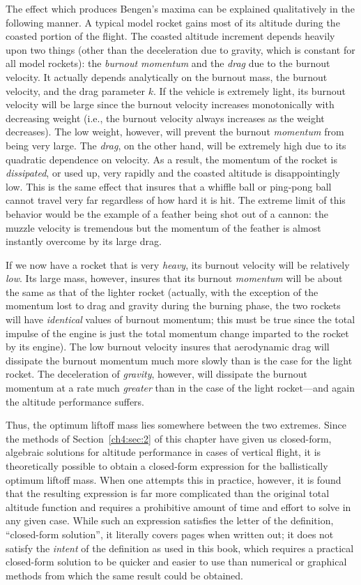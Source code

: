 The effect which produces Bengen's maxima can be explained qualitatively in the following manner.
A typical model rocket gains most of its altitude during the coasted portion of the flight. The
coasted altitude increment depends heavily upon two things (other than the deceleration due to
gravity, which is constant for all model rockets): the \emph{burnout momentum} and the \emph{drag}
due to the burnout velocity. It actually depends analytically on the burnout mass, the burnout
velocity, and the drag parameter $k$. If the vehicle is extremely light, its burnout velocity will
be large since the burnout velocity increases monotonically with decreasing weight (i.e., the
burnout velocity always increases as the weight decreases). The low weight, however, will prevent
the burnout \emph{momentum} from being very large. The \emph{drag}, on the other hand, will be
extremely high due to its quadratic dependence on velocity. As a result, the momentum of the rocket
is \emph{dissipated}, or used up, very rapidly and the coasted altitude is disappointingly low.
This is the same effect that insures that a whiffle ball or ping-pong ball cannot travel very far
regardless of how hard it is hit. The extreme limit of this behavior would be the example of a
feather being shot out of a cannon: the muzzle velocity is tremendous but the momentum of the
feather is almost instantly overcome by its large drag.

If we now have a rocket that is very \emph{heavy}, its burnout velocity will be relatively
\emph{low}. Its large mass, however, insures that its burnout \emph{momentum} will be about the
same as that of the lighter rocket (actually, with the exception of the momentum lost to drag and
gravity during the burning phase, the two rockets will have \emph{identical} values of burnout
momentum; this must be true since the total impulse of the engine is just the total momentum
change imparted to the rocket by its engine). The low burnout velocity insures that aerodynamic
drag will dissipate the burnout momentum much more slowly than is the case for the light rocket.
The deceleration of \emph{gravity}, however, will dissipate the burnout momentum at a rate much
\emph{greater} than in the case of the light rocket---and again the altitude performance suffers.

Thus, the optimum liftoff mass lies somewhere between the two extremes. Since the methods of
Section~\ref{ch4:sec:2} of this chapter have given us closed-form, algebraic solutions for
altitude performance in cases of vertical flight, it is theoretically possible to obtain a
closed-form expression for the ballistically optimum liftoff mass. When one attempts this in
practice, however, it is found that the resulting expression is far more complicated than the
original total altitude function and requires a prohibitive amount of time and effort to solve in
any given case. While such an expression satisfies the letter of the definition, ``closed-form
solution'', it literally covers pages when written out; it does not satisfy the \emph{intent} of
the definition as used in this book, which requires a practical closed-form solution to be quicker
and easier to use than numerical or graphical methods from which the same result could be
obtained.

